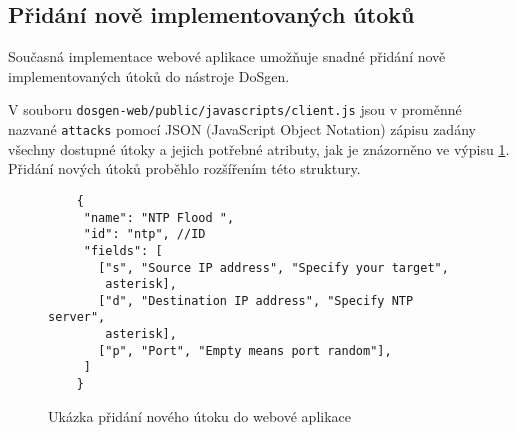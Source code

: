 \subsection{Přidání nově implementovaných útoků}
Současná implementace webové aplikace umožňuje snadné přidání nově implementovaných útoků do nástroje DoSgen.

V souboru \texttt{dosgen-web/public/javascripts/client.js} jsou v proměnné nazvané \texttt{attacks} pomocí JSON (JavaScript Object Notation) zápisu zadány všechny dostupné útoky a jejich potřebné atributy, jak je znázorněno ve výpisu \ref{fig:dosgen-web-attack-json}. Přidání nových útoků proběhlo rozšířením této struktury.


\begin{figure} [ht]
	\centering
	\begin{lstlisting}
	{
     "name": "NTP Flood ",
     "id": "ntp", //ID
     "fields": [
       ["s", "Source IP address", "Specify your target",
        asterisk],
       ["d", "Destination IP address", "Specify NTP server",
        asterisk],
       ["p", "Port", "Empty means port random"],
     ]
	}	
	\end{lstlisting}
	\caption{Ukázka přidání nového útoku do webové aplikace}
	\label{fig:dosgen-web-attack-json}
\end{figure}
